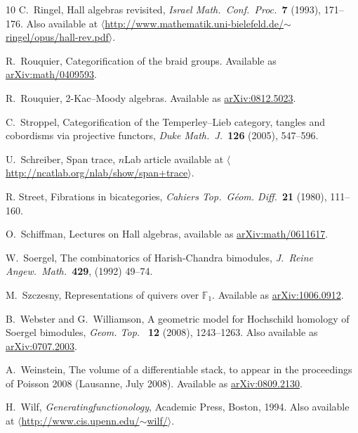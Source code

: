 \documentclass{article}
\newcommand{\F}{{\mathbb F}}
\begin{document}
\begin{thebibliography}{10}
 C.\ Ringel, Hall algebras revisited,
\textsl{Israel Math.\ Conf.\ Proc.\ }{\bf 7} (1993), 171--176.
Also available at \hfill \break
\href{http://www.mathematik.uni-bielefeld.de/~ringel/opus/hall-rev.pdf}
{$\langle$http:/\!/www.mathematik.uni-bielefeld.de/$\sim$ringel/opus/hall-rev.pdf$\rangle$}.

 R.\ Rouquier, Categorification of the braid groups.  
Available as \href{http://arxiv.org/abs/math/0409593}{arXiv:math/0409593}.

 R.\ Rouquier, 2-Kac--Moody algebras.
Available as \href{http://arxiv.org/abs/0812.5023}{arXiv:0812.5023}.

 C.\ Stroppel, Categorification of the Temperley--Lieb
category, tangles and cobordisms via projective functors, 
\textsl{Duke Math.\ J.\ }{\bf 126} (2005), 547--596. 

U.\ Schreiber, Span trace, $n$Lab article available at \hfill \break
\href{http://ncatlab.org/nlab/show/span+trace}
{$\langle$http:/\!/ncatlab.org/nlab/show/span+trace$\rangle$}.

R. Street, Fibrations in bicategories, {\em Cahiers Top.\
G\'eom. Diff.\ }{\bf 21} (1980), 111--160.

O.\ Schiffman, Lectures on Hall algebras, available as
\href{http://arxiv.org/abs/math/0611617}{arXiv:math/0611617}.

 W.\ Soergel, The combinatorics of Harish-Chandra
bimodules, \emph{J.\ Reine Angew.\ Math.\ }{\bf 429}, (1992) 49--74.

 M.\ Szczesny, Representations of quivers over
$\F_1$.  Available as \href{http://arxiv.org/abs/1006.0912}{arXiv:1006.0912}.

 B.\ Webster and G.\ Williamson, A geometric model 
for Hochschild homology of Soergel bimodules, \emph{Geom.
Top.\ } {\bf 12} (2008), 1243--1263.  Also available as 
\href{http://arxiv.org/abs/0707.2003}{arXiv:0707.2003}.

A.\ Weinstein, The volume of a differentiable stack,
to appear in the proceedings of Poisson 2008 (Lausanne, July 2008).
Available as \href{http://arxiv.org/abs/0809.2130}
{arXiv:0809.2130}.

 H.\ Wilf, {\sl Generatingfunctionology}, Academic
Press, Boston, 1994.  Also available at
\href{http://www.cis.upenn.edu/~wilf/}
{$\langle$http:/\!/www.cis.upenn.edu/$\sim$wilf/$\rangle$}.

\end{thebibliography}
\end{document}
